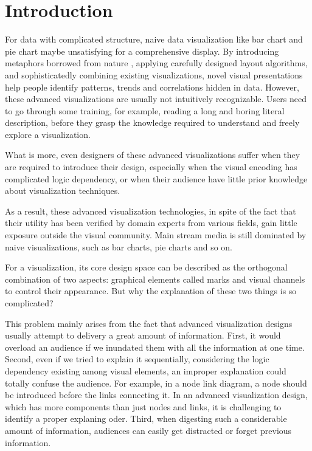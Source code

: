 \section{Introduction} %
For data with complicated structure, naive data visualization like bar chart and pie chart maybe unsatisfying for a comprehensive display. By introducing metaphors borrowed from nature \cite{cao_whisper:_2012,huron_visual_2013}, applying carefully designed layout algorithms\cite{wu_opinionflow:_2014,chi_morphable_2015}, and sophisticatedly combining existing visualizations\cite{zhao_x0023;fluxflow:_2014}, novel visual presentations help people identify patterns, trends and correlations hidden in data. However, these advanced visualizations are usually not intuitively recognizable. Users need to go through some training, for example, reading a long and boring literal description, before they grasp the knowledge required to understand and freely explore a visualization.\par
What is more, even designers of these advanced visualizations suffer when they are required to introduce their design, especially when the visual encoding has complicated logic dependency, or when their audience have little prior knowledge about visualization techniques.\par
As a result, these advanced visualization technologies, in spite of
the fact that their utility has been verified by domain experts from various fields, gain little exposure outside the visual community. Main stream media is still dominated by naive visualizations, such as bar charts, pie charts and so on.

For a visualization, its core design space can be described as the orthogonal combination of two aspects: graphical elements called marks and visual channels to control their appearance\cite{munzner_visualization_2014}. But why the explanation of these two things is so complicated? 

This problem mainly arises from the fact that advanced visualization designs usually attempt to delivery a great amount of information. First, it would overload an audience if we inundated them with all the information at one time. Second, even if we tried to explain it sequentially, considering the logic dependency existing among visual elements, an improper explanation could totally confuse the audience. For example, in a node link diagram, a node should be introduced before the links connecting it. In an advanced visualization design, which has more components than just nodes and links, it is challenging to identify a proper explaning oder. Third, when digesting such a considerable amount of information, audiences can easily get distracted or forget previous information.   

